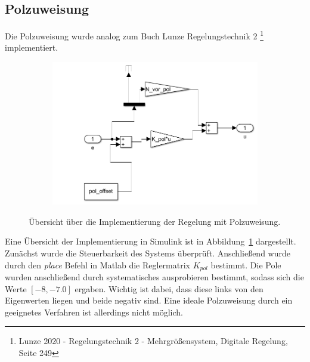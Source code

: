 \subsection{Polzuweisung}\label{subsec:polzuweisung}
Die Polzuweisung wurde analog zum Buch Lunze Regelungstechnik 2 \footnote{Lunze
2020 - Regelungstechnik 2 - Mehrgrößensystem, Digitale Regelung, Seite 249}
implementiert. 
\begin{figure}[hbt]
\centering
\begin{subfigure}{0.49\textwidth}
    \centering
    \includegraphics*[width=\textwidth]{figures/polzuw_ueb.png}
\end{subfigure}
    \caption{Übersicht über die Implementierung der Regelung mit Polzuweisung.
    \label{fig:polzuw}}
\end{figure}   
Eine Übersicht der Implementierung in Simulink ist in Abbildung~\ref{fig:polzuw}
dargestellt. Zunächst wurde die Steuerbarkeit des Systems überprüft.
Anschließend wurde durch den \textit{place} Befehl in Matlab die Reglermatrix
$K_{pol}$ bestimmt. Die Pole wurden anschließend durch systematisches
ausprobieren bestimmt, sodass sich die Werte $[-8, -7.0]$ ergaben. Wichtig ist
dabei, dass diese links von den Eigenwerten liegen und beide negativ sind. Eine
ideale Polzuweisung durch ein geeignetes Verfahren ist allerdings nicht möglich.
